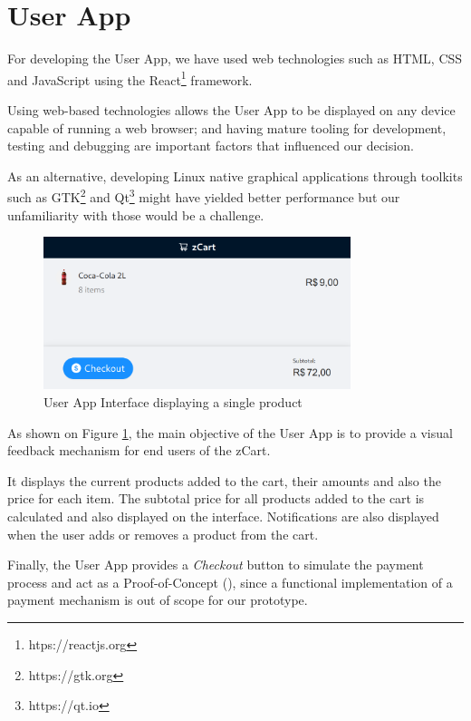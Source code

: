 \documentclass[openright]{normas-utf-tex} %
\begin{document}
\section{User App}

For developing the User App, we have used web technologies such 
as HTML, CSS \cite{Duckett2011} and JavaScript \cite{Flanagan2020} using the 
React\footnote{htps://reactjs.org} framework. 

Using web-based technologies allows the User App to be displayed on any 
device capable of running a web browser; and having mature tooling for 
development, testing and debugging are important factors that influenced 
our decision.

As an alternative, developing Linux native graphical applications through
toolkits such as GTK\footnote{https://gtk.org} and Qt\footnote{https://qt.io}
might have yielded better performance but our unfamiliarity with those would be
a challenge.

\begin{figure}[H]
	\centering
	\includegraphics[width=0.8\textwidth]{./images/ui.png}
	\caption[User App Interface display a single product]{User App Interface displaying a single product}
	\label{fig:userapp}
\end{figure}

As shown on Figure \ref{fig:userapp}, the main objective of the User App is to
provide a visual feedback mechanism for end users of the zCart.

It displays the current products added to the cart, their amounts and also the
price for each item. The subtotal price for all products added to the cart is
calculated and also displayed on the interface. Notifications are also
displayed when the user adds or removes a product from the cart. 

Finally, the User App provides a \textit{Checkout} button to simulate the payment process
and act as a Proof-of-Concept (), since a functional
implementation of a payment mechanism is out of scope for our prototype.
\end{document}

